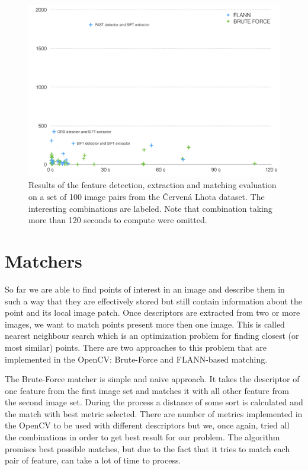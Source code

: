 \begin{figure}[ht]
	\begin{center}
		\includegraphics[keepaspectratio,width=12cm]{fig/matchers.pdf}
	\end{center}
	\caption{Results of the feature detection, extraction and matching evaluation on a set of 100 image pairs from the Červená Lhota dataset. The interesting combinations are labeled. Note that combination taking more than 120 seconds to compute were omitted.}
	\label{fig:matchers}
\end{figure}

\section{Matchers}
\label{sec:matchers}
So far we are able to find points of interest in an image and describe them in such a way that they are effectively stored but still contain information about the point and its local image patch. Once descriptors are extracted from two or more images, we want to match points present more then one image. This is called nearest neighbour search which is an optimization problem for finding closest (or most similar) points. There are two approaches to this problem that are implemented in the OpenCV: Brute-Force and FLANN-based matching.

The Brute-Force matcher is simple and naive approach. It takes the descriptor of one feature from the first image set and matches it with all other feature from the second image set. During the process a distance of some sort is calculated and the match with best metric selected. There are number of metrics implemented in the OpenCV to be used with different descriptors but we, once again, tried all the combinations in order to get best result for our problem. The algorithm promises best possible matches, but due to the fact that it tries to match each pair of feature, can take a lot of time to process. 

